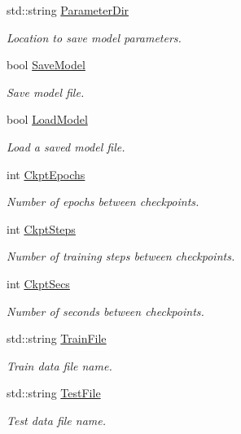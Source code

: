 \begin{DoxyCompactItemize}
std\+::string \hyperlink{classlbann_1_1TrainingParams_af2f1784c984713b57b637f2c674a5fb7}{Parameter\+Dir}
\begin{DoxyCompactList}\small\item\em Location to save model parameters. \end{DoxyCompactList}\item 
bool \hyperlink{classlbann_1_1TrainingParams_a7b828e13978654bf472399668b19cc6a}{Save\+Model}
\begin{DoxyCompactList}\small\item\em Save model file. \end{DoxyCompactList}\item 
bool \hyperlink{classlbann_1_1TrainingParams_a2b672817ae1523ad1e5f4d3c98f260e0}{Load\+Model}
\begin{DoxyCompactList}\small\item\em Load a saved model file. \end{DoxyCompactList}\item 
int \hyperlink{classlbann_1_1TrainingParams_ad113dc144a2c77609091fd36fc5816bf}{Ckpt\+Epochs}
\begin{DoxyCompactList}\small\item\em Number of epochs between checkpoints. \end{DoxyCompactList}\item 
int \hyperlink{classlbann_1_1TrainingParams_a3b1ec8d02290b369572c99b39b7d8637}{Ckpt\+Steps}
\begin{DoxyCompactList}\small\item\em Number of training steps between checkpoints. \end{DoxyCompactList}\item 
int \hyperlink{classlbann_1_1TrainingParams_ac23d388e43cb227aa72196c8b8102b92}{Ckpt\+Secs}
\begin{DoxyCompactList}\small\item\em Number of seconds between checkpoints. \end{DoxyCompactList}\item 
std\+::string \hyperlink{classlbann_1_1TrainingParams_a4ac278410cb0a24c9dc1f6edf014d003}{Train\+File}
\begin{DoxyCompactList}\small\item\em Train data file name. \end{DoxyCompactList}\item 
std\+::string \hyperlink{classlbann_1_1TrainingParams_a99502fc87d50df2055a992266fdeee05}{Test\+File}
\begin{DoxyCompactList}\small\item\em Test data file name. \end{DoxyCompactList}\item 

\end{DoxyCompactItemize}
